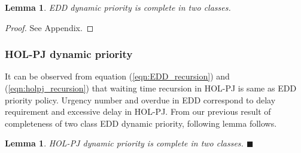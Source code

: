 \documentclass[a4paper,12pt]{article}
\newtheorem{lem}[thm]{Lemma}
\begin{document}
\begin{lem}\label{clm:EDDcomplete}
\textit{EDD dynamic priority is complete in two classes.}
\end{lem}  
\begin{proof}
See Appendix.
\end{proof}
\subsubsection{\textbf{HOL-PJ dynamic priority}}
It can be observed from equation (\ref{eqn:EDD_recursion}) and (\ref{eqn:holpj_recursion}) that waiting time recursion in HOL-PJ is same as EDD priority policy. Urgency number and overdue in EDD correspond to delay requirement and excessive delay in HOL-PJ. From our previous result of completeness of two class EDD dynamic priority, following lemma follows.
\begin{lem}
\textit{HOL-PJ dynamic priority is complete in two classes.} \hspace{2.8in}$\blacksquare$
\end{lem}
\end{document}
